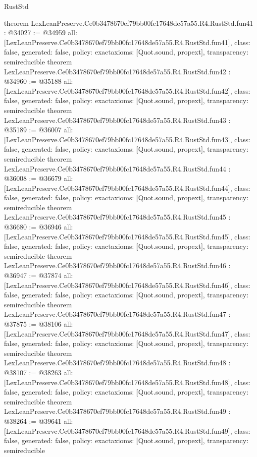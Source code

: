 \begin{lexlean}{RustStd}
\begin{coremodule}
{}
theorem LexLeanPreserve.Ce0b3478670ef79bb00fc17648de57a55.R4.RustStd.fun41 : @34027 := @34959 {
  all: [LexLeanPreserve.Ce0b3478670ef79bb00fc17648de57a55.R4.RustStd.fun41],
  class: false,
  generated: false,
  policy: exact{axioms: [Quot.sound, propext]},
  transparency: semireducible
}
theorem LexLeanPreserve.Ce0b3478670ef79bb00fc17648de57a55.R4.RustStd.fun42 : @34960 := @35188 {
  all: [LexLeanPreserve.Ce0b3478670ef79bb00fc17648de57a55.R4.RustStd.fun42],
  class: false,
  generated: false,
  policy: exact{axioms: [Quot.sound, propext]},
  transparency: semireducible
}
theorem LexLeanPreserve.Ce0b3478670ef79bb00fc17648de57a55.R4.RustStd.fun43 : @35189 := @36007 {
  all: [LexLeanPreserve.Ce0b3478670ef79bb00fc17648de57a55.R4.RustStd.fun43],
  class: false,
  generated: false,
  policy: exact{axioms: [Quot.sound, propext]},
  transparency: semireducible
}
theorem LexLeanPreserve.Ce0b3478670ef79bb00fc17648de57a55.R4.RustStd.fun44 : @36008 := @36679 {
  all: [LexLeanPreserve.Ce0b3478670ef79bb00fc17648de57a55.R4.RustStd.fun44],
  class: false,
  generated: false,
  policy: exact{axioms: [Quot.sound, propext]},
  transparency: semireducible
}
theorem LexLeanPreserve.Ce0b3478670ef79bb00fc17648de57a55.R4.RustStd.fun45 : @36680 := @36946 {
  all: [LexLeanPreserve.Ce0b3478670ef79bb00fc17648de57a55.R4.RustStd.fun45],
  class: false,
  generated: false,
  policy: exact{axioms: [Quot.sound, propext]},
  transparency: semireducible
}
theorem LexLeanPreserve.Ce0b3478670ef79bb00fc17648de57a55.R4.RustStd.fun46 : @36947 := @37874 {
  all: [LexLeanPreserve.Ce0b3478670ef79bb00fc17648de57a55.R4.RustStd.fun46],
  class: false,
  generated: false,
  policy: exact{axioms: [Quot.sound, propext]},
  transparency: semireducible
}
theorem LexLeanPreserve.Ce0b3478670ef79bb00fc17648de57a55.R4.RustStd.fun47 : @37875 := @38106 {
  all: [LexLeanPreserve.Ce0b3478670ef79bb00fc17648de57a55.R4.RustStd.fun47],
  class: false,
  generated: false,
  policy: exact{axioms: [Quot.sound, propext]},
  transparency: semireducible
}
theorem LexLeanPreserve.Ce0b3478670ef79bb00fc17648de57a55.R4.RustStd.fun48 : @38107 := @38263 {
  all: [LexLeanPreserve.Ce0b3478670ef79bb00fc17648de57a55.R4.RustStd.fun48],
  class: false,
  generated: false,
  policy: exact{axioms: [Quot.sound, propext]},
  transparency: semireducible
}
theorem LexLeanPreserve.Ce0b3478670ef79bb00fc17648de57a55.R4.RustStd.fun49 : @38264 := @39641 {
  all: [LexLeanPreserve.Ce0b3478670ef79bb00fc17648de57a55.R4.RustStd.fun49],
  class: false,
  generated: false,
  policy: exact{axioms: [Quot.sound, propext]},
  transparency: semireducible
}
\end{coremodule}
\end{lexlean}

